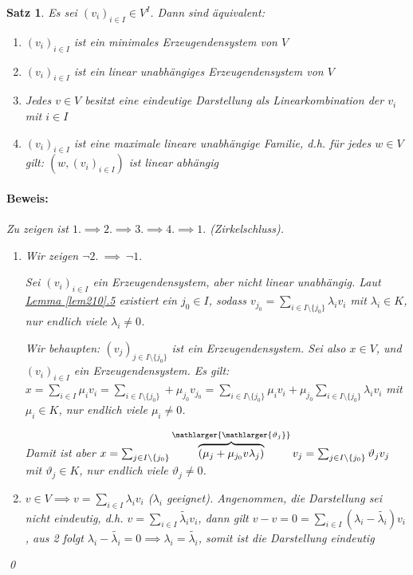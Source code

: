 \documentclass{report}
\newcommand{\lb}{\lambda}
\theoremstyle{customrem}
\theoremstyle{customdef}
\newtheorem{satz}[definition]{Satz}
\renewenvironment{proof}{\paragraph{Beweis: }}{\qed}
\theoremstyle{customenv}
\begin{document}
	\begin{satz}
		Es sei \((v_i)_{i\in I} \in V^I\). Dann sind äquivalent:
		\begin{enumerate}
			\item \((v_i)_{i \in I}\) ist ein minimales Erzeugendensystem von \(V\)
			\item \((v_i)_{i \in I}\) ist ein linear unabhängiges Erzeugendensystem von \(V\)
			\item Jedes \(v \in V\) besitzt eine eindeutige Darstellung als Linearkombination der \(v_i\) mit \(i \in I\)
			\item \((v_i)_{i \in I}\) ist eine maximale lineare unabhängige Familie, d.h. für jedes \(w \in V\) gilt: \((w, (v_i)_{i \in I})\) ist linear abhängig\\
		\end{enumerate}

		\begin{proof}
			Zu zeigen ist \(1. \implies 2. \implies 3. \implies 4. \implies 1.\) (Zirkelschluss).
			\begin{enumerate}[leftmargin=1.9cm]
				\item[1. \(\implies\) 2. ] Wir zeigen \(\neg2.\ \implies\ \neg 1.\)

				Sei \((v_i)_{i\in I}\) ein Erzeugendensystem, aber nicht linear unabhängig. Laut \hyperref[lem210]{Lemma \ref*{lem210}.5} existiert ein \(j_0\in I\), sodass \(v_{j_0} = \sum_{i\in I\setminus\{j_0\}} \lb_i v_i\) mit \(\lb_i\in K\), nur endlich viele \(\lb_i\not=0\).

				Wir behaupten: \((v_j)_{j\in I\setminus\{j_0\}}\) ist ein Erzeugendensystem. Sei also \(x\in V\), und \((v_i)_{i\in I}\) ein Erzeugendensystem. Es gilt: \(x=\sum_{i\in I}\mu_iv_i = \sum_{i\in I\setminus\{j_0\}} + \mu_{j_0}v_{j_0} = \sum_{i\in I\setminus\{j_0\}}\mu_i v_i + \mu_{j_0}\sum_{i\in I\setminus\{j_0\}} \lb_i v_i\) mit \(\mu_i\in K\), nur endlich viele \(\mu_i \not= 0\).

				Damit ist aber \(x=\sum_{j\in I\setminus\{j_0\}}\overbrace{(\mu_j+\mu_{j_0}v\lb_j)}^{\mathlarger{\mathlarger{\vartheta_j}}}v_j = \sum_{j\in I\setminus\{j_0\}} \vartheta_j v_j\) mit \(\vartheta_j\in K\), nur endlich viele \(\vartheta_j\not=0\).

				\item[2. \(\implies\) 3. ] \(v \in V \implies v = \sum_{i \in I}\lb_i v_i\) (\(\lb_i\) geeignet). Angenommen, die Darstellung sei nicht eindeutig, d.h. \(v = \sum_{i \in I}\widetilde{\lb_i} v_i\), dann gilt \(v - v = 0 = \sum_{i \in I} (\lb_i - \widetilde{\lb_i}) v_i\), aus 2 folgt \(\lb_i - \widetilde{\lb_i} = 0 \implies \lb_i = \widetilde{\lb_i}\), somit ist die Darstellung eindeutig


\end{enumerate}
\end{proof}
\end{satz}
\end{document}
